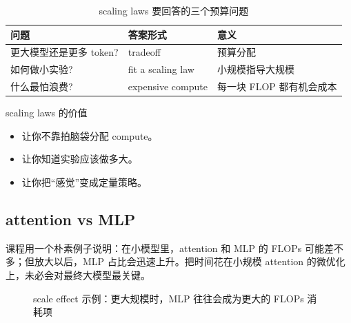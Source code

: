 \documentclass[a4paper]{article}
\begin{document}
\begin{table}[H]
\centering
\begin{tabular}{p{3.0cm}p{4.3cm}p{5.8cm}}
\toprule
\textbf{问题} & \textbf{答案形式} & \textbf{意义} \\
\midrule
更大模型还是更多 token? & tradeoff & 预算分配 \\
如何做小实验? & fit a scaling law & 小规模指导大规模 \\
什么最怕浪费? & expensive compute & 每一块 FLOP 都有机会成本 \\
\bottomrule
\end{tabular}
\caption{scaling laws 要回答的三个预算问题}
\end{table}

\begin{knowledgebox}{scaling laws 的价值}
\begin{itemize}
    \item 让你不靠拍脑袋分配 compute。
    \item 让你知道实验应该做多大。
    \item 让你把“感觉”变成定量策略。
\end{itemize}
\end{knowledgebox}

\subsection{attention vs MLP}

课程用一个朴素例子说明：在小模型里，attention 和 MLP 的 FLOPs 可能差不多；但放大以后，MLP 占比会迅速上升。把时间花在小规模 attention 的微优化上，未必会对最终大模型最关键。

\begin{figure}[H]
\centering
{}
\caption{scale effect 示例：更大规模时，MLP 往往会成为更大的 FLOPs 消耗项}
\end{figure}
\end{document}
